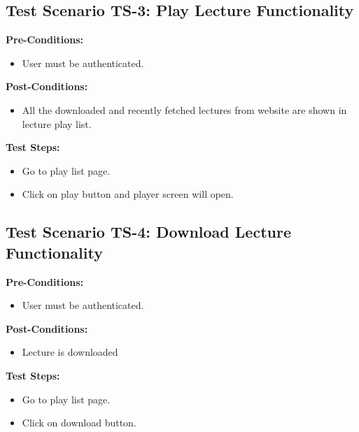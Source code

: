 \subsection{Test Scenario TS-3: Play Lecture Functionality}

\textbf{Pre-Conditions: }
\begin{itemize}

\item User must be authenticated.

\end{itemize}


\textbf{Post-Conditions: }
\begin{itemize}

\item All the downloaded and recently fetched lectures from website are shown in lecture play list.

\end{itemize}


\textbf{Test Steps:}
\begin{itemize}

\item Go to play list page.
\item Click on play button and player screen will open.

\end{itemize}


\subsection{Test Scenario TS-4: Download Lecture Functionality}

\textbf{Pre-Conditions: }
\begin{itemize}

\item User must be authenticated.

\end{itemize}


\textbf{Post-Conditions: }
\begin{itemize}

\item Lecture is downloaded

\end{itemize}


\textbf{Test Steps:}
\begin{itemize}

\item Go to play list page.
\item Click on download button.

\end{itemize}


